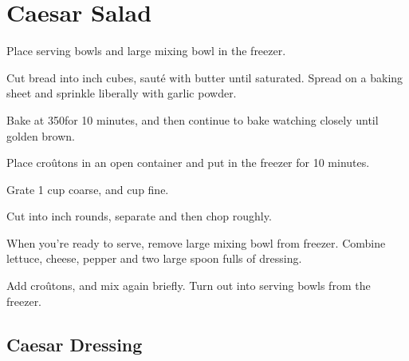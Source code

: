 \section{Caesar Salad}
\begin{recipe}

Place serving bowls and large mixing bowl in the freezer.


Cut bread into  inch cubes, sauté  with butter until saturated. Spread on a baking sheet and sprinkle liberally with garlic powder.

Bake at 350\degree for 10 minutes, and then continue to bake watching closely until golden brown.

Place croûtons in an open container and put in the freezer for 10 minutes.


Grate 1 cup coarse, and  cup fine.

\columnbreak


Cut into  inch rounds, separate and then chop roughly.


When you're ready to serve, remove large mixing bowl from freezer. Combine lettuce, cheese, pepper and two large spoon fulls of dressing.

Add croûtons, and mix again briefly. Turn out into serving bowls from the freezer.


\subsection{Caesar Dressing}



\end{recipe}

